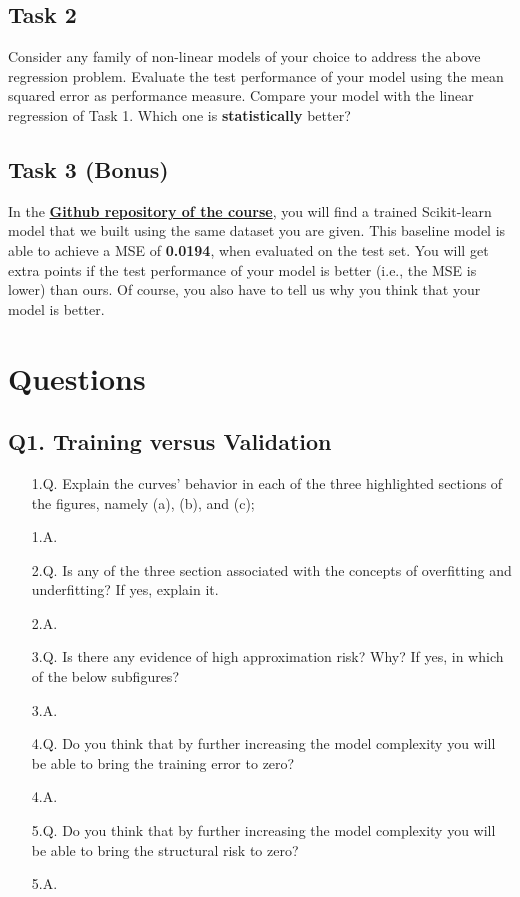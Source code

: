 \documentclass[11pt]{scrartcl}
\begin{document}
\subsection{Task 2}
Consider any family of non-linear models of your choice to address the above regression problem. Evaluate the test performance of your model using the mean squared error as performance measure. Compare your model with the linear regression of Task 1. Which one is \textbf{statistically} better?

\subsection{Task 3 (Bonus)}
In the \href{https://github.com/marshka/ml-20-21}{\textbf{Github repository of the course}}, you will find a trained Scikit-learn model that we built using the same dataset you are given. This baseline model is able to achieve a MSE of \textbf{0.0194}, when evaluated on the test set. You will get extra points if the test performance of your model is better (i.e., the MSE is lower) than ours. Of course, you also have to tell us why you think that your model is better.


\newpage
\section{Questions}

\subsection{Q1. Training versus Validation}
\begin{itemize}
\item[1.Q.] Explain the curves' behavior in each of the three highlighted sections of the figures, namely (a), (b), and (c);
\item[1.A.] ~\\
\item[2.Q.] Is any of the three section associated with the concepts of overfitting and underfitting? If yes, explain it.
\item[2.A.] ~\\
\item[3.Q.] Is there any evidence of high approximation risk? Why? If yes, in which of the below subfigures?
\item[3.A.] ~\\
\item[4.Q.] Do you think that by further increasing the model complexity you will be able to bring the training error to zero?
\item[4.A.] ~\\
\item[5.Q.] Do you think that by further increasing the model complexity you will be able to bring the structural risk to zero?
\item[5.A.] ~\\
\end{itemize}
\end{document}
